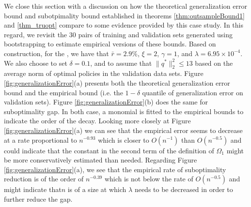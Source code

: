 \documentclass[]{interact}
\theoremstyle{plain}%
\theoremstyle{definition}
\theoremstyle{remark}
\newcommand{\0}{\V{0}}
\newcommand{\1}{\V{1}}
\theoremstyle{plain}
\theoremstyle{definition}
\begin{document}
We close this section with a discussion on how the theoretical generalization error bound and subotpimality bound established in theorems \ref{thm:outsampleBound1} and \ref{thm_truopt} compare to some evidence provided by this case study. In this regard, we revisit the 30 pairs of training and validation sets generated using bootstrapping to estimate empirical versions of these bounds. Based on construction, for the \adaptPclipped{}, we have that  $\bar{r}=2.9\%$, $\xi=2$, $\gamma=1$, and $\lambda=6.95\times10^{-4}$. We also choose to set $\delta=0.1$, and to assume that $\|q^*\|_2^2\leq 13$ based on the average norm of optimal policies in the validation data sets. Figure \ref{fig:generalizationError}(a) presents both the theoretical generalization error bound and the empirical bound (i.e. the $1-\delta$ quantile of generalization error on validation sets). Figure \ref{fig:generalizationError}(b) does the same for suboptimality gap. In both case, a monomial is fitted to the empirical bounds to indicate the order of the decay. Looking more closely at Figure \ref{fig:generalizationError}(a) we can see that the empirical error seems to decrease at a rate proportional to $n^{-0.93}$ which is closer to $O(n^{-1})$ than $O(n^{-0.5})$ and could indicate that the constant in the second term of the definition of  $\Omega_1$ might be more conservatively estimated than needed. Regarding Figure \ref{fig:generalizationError}(a), we see that the empirical rate of suboptimality reduction is of the order of $n^{-0.39}$ which is not below the rate of $O(n^{-0.5})$ and might indicate that$n$ is of a size at which $\lambda$ needs to be decreased in order to further reduce the gap.
\end{document}

